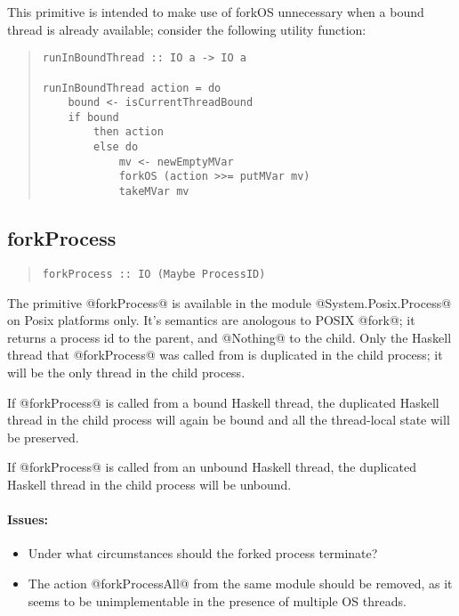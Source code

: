 \documentclass{article}
\begin{document}
This primitive is intended to make use of forkOS unnecessary when a bound
thread is already available; consider the following utility function:

\begin{quote}
\begin{verbatim}
runInBoundThread :: IO a -> IO a

runInBoundThread action = do
    bound <- isCurrentThreadBound
    if bound
        then action
        else do
            mv <- newEmptyMVar
            forkOS (action >>= putMVar mv)
            takeMVar mv
\end{verbatim}
\end{quote}

\subsection{forkProcess}

\begin{quote}
\begin{verbatim}
forkProcess :: IO (Maybe ProcessID)
\end{verbatim}
\end{quote}

The primitive @forkProcess@ is available in the module @System.Posix.Process@
on Posix platforms only.
It's semantics are anologous to POSIX @fork@; it returns a process
id to the parent, and @Nothing@ to the child. Only the Haskell thread that
@forkProcess@ was called from is duplicated in the child process; it
will be the only thread in the child process.

If @forkProcess@ is called from a bound Haskell thread, the duplicated Haskell
thread in the child process will again be bound and all the thread-local
state will be preserved.

If @forkProcess@ is called from an unbound Haskell thread, the duplicated
Haskell thread in the child process will be unbound.

\paragraph{Issues:}
\begin{itemize}
\item Under what circumstances should the forked process terminate?
\item The action @forkProcessAll@ from the same module should be removed, as
      it seems to be unimplementable in the presence of multiple OS threads.
\end{itemize}
\end{document}
